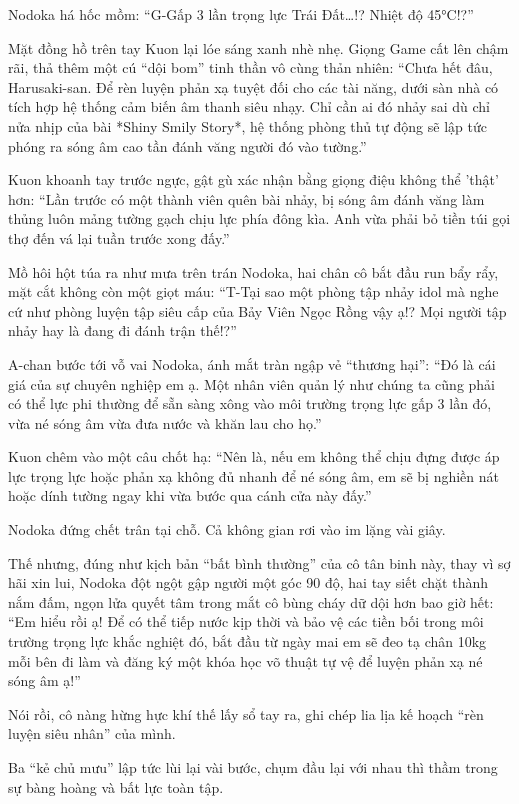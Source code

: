 \documentclass[../main.tex]{subfiles}
\begin{document}
Nodoka há hốc mồm: ``G-Gấp 3 lần trọng lực Trái Đất\dots!? Nhiệt độ 45°C!?''

Mặt đồng hồ trên tay Kuon lại lóe sáng xanh nhè nhẹ. Giọng Game cất lên chậm rãi, thả thêm một cú ``dội bom'' tinh thần vô cùng thản nhiên: ``Chưa hết đâu, Harusaki-san. Để rèn luyện phản xạ tuyệt đối cho các tài năng, dưới sàn nhà có tích hợp hệ thống cảm biến âm thanh siêu nhạy. Chỉ cần ai đó nhảy sai dù chỉ nửa nhịp của bài *Shiny Smily Story*, hệ thống phòng thủ tự động sẽ lập tức phóng ra sóng âm cao tần đánh văng người đó vào tường.''

Kuon khoanh tay trước ngực, gật gù xác nhận bằng giọng điệu không thể 'thật' hơn: ``Lần trước có một thành viên quên bài nhảy, bị sóng âm đánh văng làm thủng luôn mảng tường gạch chịu lực phía đông kìa. Anh vừa phải bỏ tiền túi gọi thợ đến vá lại tuần trước xong đấy.''

Mồ hôi hột túa ra như mưa trên trán Nodoka, hai chân cô bắt đầu run bẩy rẩy, mặt cắt không còn một giọt máu: ``T-Tại sao một phòng tập nhảy idol mà nghe cứ như phòng luyện tập siêu cấp của Bảy Viên Ngọc Rồng vậy ạ!? Mọi người tập nhảy hay là đang đi đánh trận thế!?''

A-chan bước tới vỗ vai Nodoka, ánh mắt tràn ngập vẻ ``thương hại'': ``Đó là cái giá của sự chuyên nghiệp em ạ. Một nhân viên quản lý như chúng ta cũng phải có thể lực phi thường để sẵn sàng xông vào môi trường trọng lực gấp 3 lần đó, vừa né sóng âm vừa đưa nước và khăn lau cho họ.''

Kuon chêm vào một câu chốt hạ: ``Nên là, nếu em không thể chịu đựng được áp lực trọng lực hoặc phản xạ không đủ nhanh để né sóng âm, em sẽ bị nghiền nát hoặc dính tường ngay khi vừa bước qua cánh cửa này đấy.''

Nodoka đứng chết trân tại chỗ. Cả không gian rơi vào im lặng vài giây.

Thế nhưng, đúng như kịch bản ``bất bình thường'' của cô tân binh này, thay vì sợ hãi xin lui, Nodoka đột ngột gập người một góc 90 độ, hai tay siết chặt thành nắm đấm, ngọn lửa quyết tâm trong mắt cô bùng cháy dữ dội hơn bao giờ hết: ``Em hiểu rồi ạ! Để có thể tiếp nước kịp thời và bảo vệ các tiền bối trong môi trường trọng lực khắc nghiệt đó, bắt đầu từ ngày mai em sẽ đeo tạ chân 10kg mỗi bên đi làm và đăng ký một khóa học võ thuật tự vệ để luyện phản xạ né sóng âm ạ!''

Nói rồi, cô nàng hừng hực khí thế lấy sổ tay ra, ghi chép lia lịa kế hoạch ``rèn luyện siêu nhân'' của mình.

Ba ``kẻ chủ mưu'' lập tức lùi lại vài bước, chụm đầu lại với nhau thì thầm trong sự bàng hoàng và bất lực toàn tập.
\end{document}
